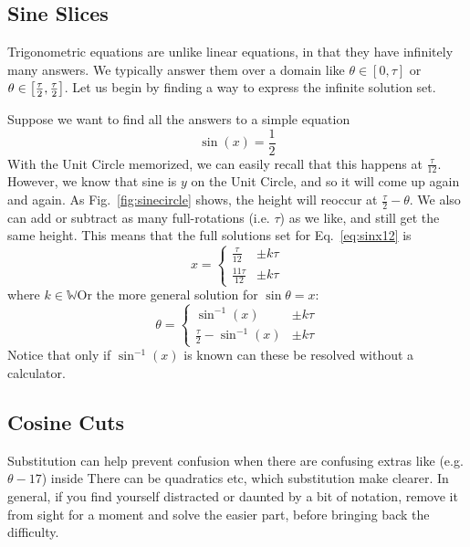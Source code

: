 
\subsection{Sine Slices}
Trigonometric equations are unlike linear equations, in that they have infinitely many
answers.  We typically answer them over a domain like $\theta \in \left[0,\tau\right]$ or
$\theta \in \left[\-\frac{\tau}{2},\frac{\tau}{2}\right]$.  Let us begin by finding a way to
express the infinite solution set.

Suppose we want to find all the answers to a simple equation
\begin{equation}\label{eq:sinx12}
\sin(x) = \frac{1}{2}
\end{equation}
With the Unit Circle memorized, we can easily recall that this happens at 
$\frac{\tau}{12}$.  However, we know that sine is $y$ on the Unit Circle, and so it
will come up again and again.  As Fig.~\ref{fig:sinecircle} shows, the height will
reoccur at $\frac{\tau}{2}-\theta$.  We also can add or subtract as many full-rotations
(i.e. $\tau$) as we like, and still get the same height.  This means that the full
solutions set for Eq.~\ref{eq:sinx12} is
$$
x  = \begin{cases} \frac{\tau}{12} & \pm k\tau\\
\frac{11\tau}{12} & \pm k\tau \end{cases} 
$$
where $k \in \mathbb{W}$Or the more general solution for $\sin\theta=x$:
\begin{equation}
\theta  = \begin{cases} \sin^{-1}(x) & \pm k\tau\\
\frac{\tau}{2} - \sin^{-1}(x) & \pm k\tau \end{cases} 
\end{equation}
Notice that only if $\sin^{-1}(x)$ is known can these be resolved without a
calculator.

\subsection{Cosine Cuts}
Substitution can help prevent confusion when there are confusing extras like (e.g. $\theta-17$) inside
There can be quadratics etc, which substitution make clearer.  In general, if you find
yourself distracted or daunted by a bit of notation, remove it from sight for a moment and
solve the easier part, before bringing back the difficulty.

